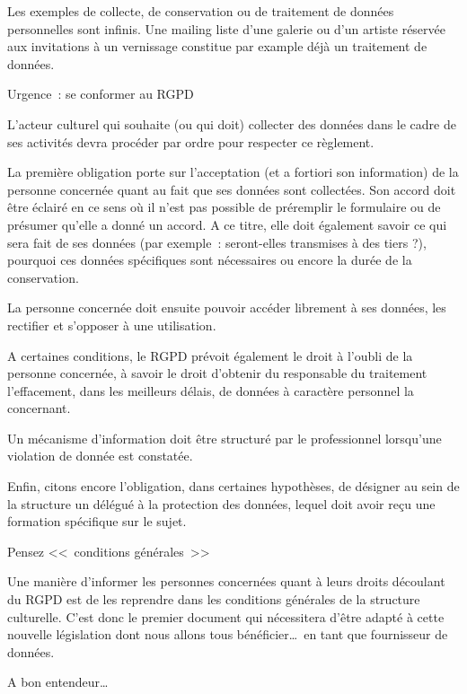 \documentclass[11pt, french]{article}
\begin{document}
Les exemples de collecte, de conservation ou de traitement de données
personnelles sont infinis. Une mailing liste d'une galerie ou d'un
artiste réservée aux invitations à un vernissage constitue par example
déjà un traitement de données.

Urgence~: se conformer au RGPD

L'acteur culturel qui souhaite (ou qui doit) collecter des données
dans le cadre de ses activités devra procéder par ordre pour respecter
ce règlement.

La première obligation porte sur l'acceptation (et a fortiori son
information) de la personne concernée quant au fait que ses données
sont collectées. Son accord doit être éclairé en ce sens où il n'est
pas possible de préremplir le formulaire ou de présumer qu'elle a
donné un accord. A ce titre, elle doit également savoir ce qui sera
fait de ses données (par exemple~: seront-elles transmises à des tiers
?), pourquoi ces données spécifiques sont nécessaires ou encore la
durée de la conservation.

La personne concernée doit ensuite pouvoir accéder librement à ses
données, les rectifier et s'opposer à une utilisation.

A certaines conditions, le RGPD prévoit également le droit à l'oubli
de la personne concernée, à savoir le droit d'obtenir du responsable
du traitement l'effacement, dans les meilleurs délais, de données à
caractère personnel la concernant.

Un mécanisme d'information doit être structuré par le professionnel
lorsqu'une violation de donnée est constatée.

Enfin, citons encore l'obligation, dans certaines hypothèses, de
désigner au sein de la structure un délégué à la protection des
données, lequel doit avoir reçu une formation spécifique sur le sujet.

Pensez <<~conditions générales~>>

Une manière d'informer les personnes concernées quant à leurs droits
découlant du RGPD est de les reprendre dans les conditions générales
de la structure culturelle. C'est donc le premier document qui
nécessitera d'être adapté à cette nouvelle législation dont nous
allons tous bénéficier\ldots\ en tant que fournisseur de données.

A bon entendeur\ldots
\end{document}
